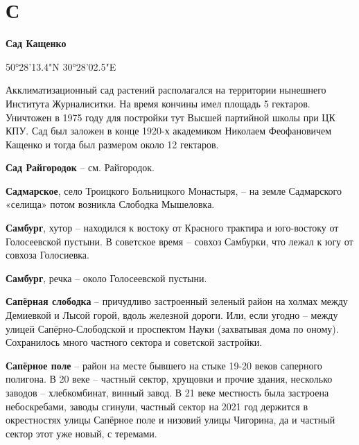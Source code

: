 \chapter*{С}

\textbf{Сад Кащенко}

50°28'13.4"N 30°28'02.5"E

Акклиматизационный сад растений располагался на территории нынешнего Института Журналиситки. На время кончины имел площадь 5 гектаров. Уничтожен в 1975 году для постройки тут Высшей партийной школы при ЦК КПУ. Сад был заложен в конце 1920-х академиком Николаем Феофановичем Кащенко и тогда был размером около 12 гектаров.\\

\medskip

\textbf{Сад Райгородок} – см. Райгородок.\\

\medskip


\textbf{Садмарское}, село Троицкого Больницкого Монастыря, – на земле Садмарского «селища» потом возникла Слободка Мышеловка.\\

\medskip

\textbf{Самбург}, хутор – находился к востоку от Красного трактира и юго-востоку от Голосеевской пустыни. В советское время – совхоз Самбурки, что лежал к югу от совхоза Голосиевка.\\

\medskip

\textbf{Самбург}, речка – около Голосеевской пустыни.\\

\medskip

\textbf{Сапёрная слободка} – причудливо застроенный зеленый район на холмах между Демиевкой и Лысой горой, вдоль железной дороги. Или, если угодно – между улицей Сапёрно-Слободской и проспектом Науки (захватывая дома по оному). Сохранилось много частного сектора и советской застройки.\\

\medskip

\textbf{Сапёрное поле} – район на месте бывшего на стыке 19-20 веков саперного полигона. В 20 веке – частный сектор, хрущовки и прочие здания, несколько заводов – хлебкомбинат, винный завод. В 21 веке местность была застроена небоскребами, заводы сгинули, частный сектор на 2021 год держится в окрестностях улицы Сапёрное поле и низовий улицы Чигорина, да и частный сектор этот уже новый, с теремами.\\

